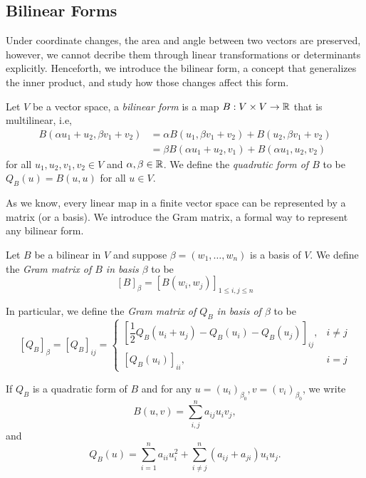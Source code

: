 ﻿\documentclass[12pt]{article}
\begin{document}
\subsection{Bilinear Forms}
Under coordinate changes, the area and angle between two vectors are preserved, however, we cannot decribe them through linear transformations or determinants explicitly. Henceforth, we introduce the bilinear form, a concept that generalizes the inner product, and study how those changes affect this form.
\begin{definition}
    Let $V$ be a vector space, a \textit{bilinear form} is a map $B: V \times V \to \mathbb{R}$ that is multilinear, i.e,
    \begin{align*}
        B(\alpha u_1 + u_2, \beta v_1 + v_2) &= \alpha B(u_1, \beta v_1 + v_2) + B(u_2, \beta v_1 + v_2)\\
        &= \beta B(\alpha u_1 + u_2, v_1) + B(\alpha u_1, u_2, v_2)
    \end{align*}
    for all $u_1,u_2,v_1,v_2 \in V$ and $\alpha, \beta \in \mathbb{R}$. 
    We define the \textit{quadratic form of $B$} to be $Q_B(u) = B(u,u)$ for all $u \in V$.
\end{definition}
As we know, every linear map in a finite vector space can be represented by a matrix (or a basis). We introduce the Gram matrix, a formal way to represent any bilinear form.
\begin{definition}
    Let $B$ be a bilinear in $V$ and suppose $\beta = (w_1,\dots, w_n)$ is a basis of $V$. We define the \textit{Gram matrix of $B$ in basis $\beta$} to be
    \[
        [B]_\beta = \left[B(w_i,w_j)\right]_{1 \leq i,j \leq n}
    \]

    In particular, we define the \textit{Gram matrix of $Q_B$ in basis of $\beta$} to be
    \[
        [Q_B]_\beta = [Q_{B}]_{ij} =  \begin{cases}
            \left[\dfrac{1}{2}Q_B(u_i + u_j) - Q_B(u_i) - Q_B(u_j)\right]_{ij}, &i \neq j\\
            [Q_B(u_i)]_{ii}, & i = j
        \end{cases}
    \]
\end{definition}
If $Q_B$ is a quadratic form of $B$ and for any $u = (u_i)_{\beta_0}, v= (v_i)_{\beta_0}$, we write 
    \begin{equation}\label{bilinear}
        B(u,v) = \sum_{i, j}^n a_{ij}u_iv_j,    
    \end{equation}
    and 
    \begin{equation}\label{quadratic}
        Q_B(u) = \sum_{i = 1}^n a_{ii}u_i^2 + \sum_{i \neq j}^n (a_{ij} + a_{ji})u_{i}u_j.    
    \end{equation}
\end{document}
